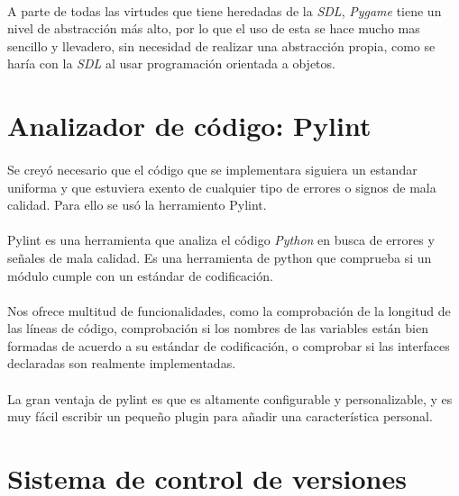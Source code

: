 \paragraph{}
A parte de todas las virtudes que tiene heredadas de la \emph{SDL}, \emph{Pygame} tiene un nivel de abstracción más alto, por lo que
el uso de esta se hace mucho mas sencillo y llevadero, sin necesidad de realizar una abstracción propia, como se haría con la 
\emph{SDL} al usar programación orientada a objetos.

\section{Analizador de código: Pylint}

\paragraph{}
Se creyó necesario que el código que se implementara siguiera un estandar uniforma y que estuviera exento de cualquier tipo de 
errores o signos de mala calidad. Para ello se usó la herramiento Pylint.

\paragraph{}
Pylint es una herramienta que analiza el código \emph{Python} en busca de errores y señales de mala calidad. Es una herramienta 
de python que comprueba si un módulo cumple con un estándar de codificación.

\paragraph{}
Nos ofrece multitud de funcionalidades, como la comprobación de la longitud de las líneas de código, comprobación si los nombres de 
las variables están bien formadas de acuerdo a su estándar de codificación, o comprobar si las interfaces declaradas son realmente 
implementadas.

\paragraph{}
La gran ventaja de pylint es que es altamente configurable y personalizable, y es muy fácil escribir un pequeño plugin para 
añadir una característica personal.

\section{Sistema de control de versiones}

